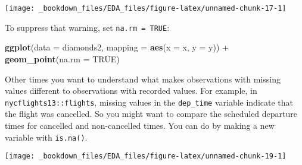 \documentclass[]{book}
\newenvironment{Shaded}{\begin{snugshade}}{\end{snugshade}}
\newcommand{\KeywordTok}[1]{\textcolor[rgb]{0.13,0.29,0.53}{\textbf{{#1}}}}
\newcommand{\DataTypeTok}[1]{\textcolor[rgb]{0.13,0.29,0.53}{{#1}}}
\newcommand{\DecValTok}[1]{\textcolor[rgb]{0.00,0.00,0.81}{{#1}}}
\newcommand{\StringTok}[1]{\textcolor[rgb]{0.31,0.60,0.02}{{#1}}}
\newcommand{\OtherTok}[1]{\textcolor[rgb]{0.56,0.35,0.01}{{#1}}}
\newcommand{\NormalTok}[1]{{#1}}
\begin{document}
\begin{center}\texttt{[image: \_bookdown\_files/EDA\_files/figure-latex/unnamed-chunk-17-1]} \end{center}

To suppress that warning, set \texttt{na.rm\ =\ TRUE}:

\begin{Shaded}
\begin{Highlighting}[]
\KeywordTok{ggplot}\NormalTok{(}\DataTypeTok{data =} \NormalTok{diamonds2, }\DataTypeTok{mapping =} \KeywordTok{aes}\NormalTok{(}\DataTypeTok{x =} \NormalTok{x, }\DataTypeTok{y =} \NormalTok{y)) +}\StringTok{ }
\StringTok{  }\KeywordTok{geom_point}\NormalTok{(}\DataTypeTok{na.rm =} \OtherTok{TRUE}\NormalTok{)}
\end{Highlighting}
\end{Shaded}

Other times you want to understand what makes observations with missing
values different to observations with recorded values. For example, in
\texttt{nycflights13::flights}, missing values in the \texttt{dep\_time}
variable indicate that the flight was cancelled. So you might want to
compare the scheduled departure times for cancelled and non-cancelled
times. You can do by making a new variable with \texttt{is.na()}.

\begin{Shaded}
\end{Shaded}

\begin{center}\texttt{[image: \_bookdown\_files/EDA\_files/figure-latex/unnamed-chunk-19-1]} \end{center}
\end{document}
